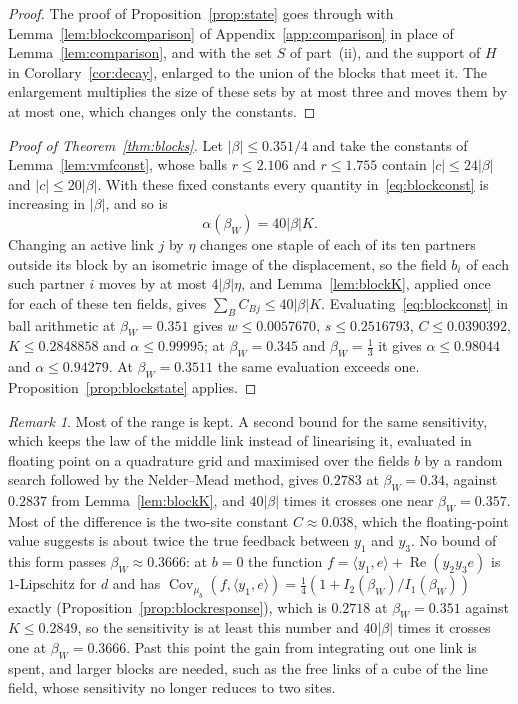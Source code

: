 \documentclass[11pt]{amsart}
\theoremstyle{definition}
\theoremstyle{remark}
\newtheorem{remark}[theorem]{Remark}
\numberwithin{equation}{section}
\newcommand{\Cov}{\operatorname{Cov}}
\newcommand{\ip}[2]{\langle #1,#2\rangle}
\begin{document}
\begin{proof}
The proof of Proposition~\ref{prop:state} goes through with
Lemma~\ref{lem:blockcomparison} of Appendix~\ref{app:comparison} in place of
Lemma~\ref{lem:comparison}, and with the set $S$ of part~(ii), and the
support of $H$ in Corollary~\ref{cor:decay}, enlarged to the union of the
blocks that meet it. The enlargement multiplies the size of these sets by at
most three and moves them by at most one, which changes only the constants.
\end{proof}

\begin{proof}[Proof of Theorem~\ref{thm:blocks}]
Let $|\beta|\le0.351/4$ and take the constants of Lemma~\ref{lem:vmfconst},
whose balls $r\le2.106$ and $r\le1.755$ contain $|c|\le24|\beta|$ and $|c|\le20|\beta|$. With these fixed constants
every quantity in~\eqref{eq:blockconst} is increasing in $|\beta|$, and so is
\begin{equation}\label{eq:alphablock}
\alpha(\beta_W)=40|\beta|K .
\end{equation}
Changing an active link $j$ by $\eta$ changes one staple of each of its ten
partners outside its block by an isometric image of the displacement, so the
field $b_i$ of each such partner $i$ moves by at most $4|\beta|\eta$, and
Lemma~\ref{lem:blockK}, applied once for each of these ten fields, gives
$\sum_BC_{Bj}\le40|\beta|K$. Evaluating~\eqref{eq:blockconst} in ball
arithmetic at $\beta_W=0.351$ gives $w\le0.0057670$, $s\le0.2516793$,
$C\le0.0390392$, $K\le0.2848858$ and $\alpha\le0.99995$; at $\beta_W=0.345$ and
$\beta_W=\frac13$ it gives $\alpha\le0.98044$ and $\alpha\le0.94279$. At
$\beta_W=0.3511$ the same evaluation exceeds one. Proposition~\ref{prop:blockstate} applies.
\end{proof}

\begin{remark}\label{rem:blockgap}
Most of the range is kept. A second bound for the same sensitivity, which
keeps the law of the middle link instead of linearising it, evaluated in
floating point on a quadrature grid and maximised over the fields $b$ by a
random search followed by the Nelder--Mead method, gives $0.2783$ at
$\beta_W=0.34$, against $0.2837$ from Lemma~\ref{lem:blockK}, and $40|\beta|$
times it crosses one near $\beta_W=0.357$. Most of the difference is the
two-site constant $C\approx0.038$, which the floating-point value suggests is
about twice the true feedback between $y_1$ and $y_3$. No bound of this form
passes $\beta_W\approx0.3666$: at $b=0$ the function $f=\ip{y_1}e+
\operatorname{Re}(y_2y_3e)$ is $1$-Lipschitz for $d$ and has $\Cov_{\mu_b}(f,
\ip{y_1}e)=\frac14(1+I_2(\beta_W)/I_1(\beta_W))$ exactly
(Proposition~\ref{prop:blockresponse}), which is $0.2718$ at
$\beta_W=0.351$ against $K\le0.2849$, so the sensitivity is at least this
number and $40|\beta|$ times it crosses one at $\beta_W=0.3666$. Past this point the gain from integrating out
one link is spent, and larger blocks are needed, such as the free links of a
cube of the line field, whose sensitivity no longer reduces to two sites.
\end{remark}
\end{document}
